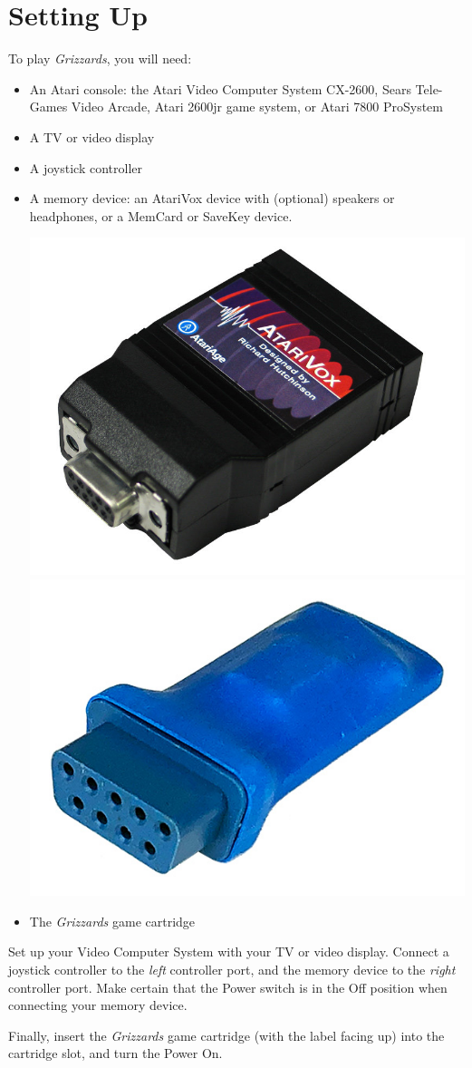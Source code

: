 \documentclass[10pt,twocolumn,openany,article]{memoir}
\begin{document}
\mainmatter

\tableofcontents

\chapter{Setting Up}\label{Setting Up}

To play \textit{Grizzards}, you will need:

\begin{itemize}
\item An Atari  console: the Atari Video Computer  System CX-2600, Sears
  Tele-Games  Video Arcade,  Atari  2600jr game  system,  or Atari  7800
  ProSystem
\item A TV or video display
\item A joystick controller
\item A  memory device: an  AtariVox device with (optional)  speakers or
  headphones, or a MemCard or SaveKey device.

  \includegraphics[width=.4\columnwidth]{../Manual/AtariVox.jpeg}
  \includegraphics[width=.4\columnwidth]{../Manual/SaveKey.jpeg}

\item The \textit{Grizzards} game cartridge
\end{itemize}


Set  up your  Video  Computer  System with  your  TV  or video  display.
Connect a  joystick controller to  the \emph{left} controller  port, and
the memory device to the \emph{right} controller port. Make certain that
the  Power  switch   is  in  the  Off  position   when  connecting  your
memory device.

Finally, insert  the \textit{Grizzards}  game cartridge (with  the label
facing up) into the cartridge slot, and turn the Power On.
\end{document}
